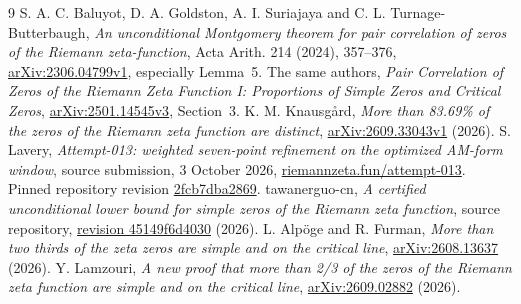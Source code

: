 \documentclass[11pt]{article}
\theoremstyle{remark}\newtheorem{remark}[theorem]{Remark}
\begin{document}
\begin{thebibliography}{9}
 S. A. C. Baluyot, D. A. Goldston, A. I. Suriajaya and
C. L. Turnage-Butterbaugh, \emph{An unconditional Montgomery theorem for pair
correlation of zeros of the Riemann zeta-function}, Acta Arith. 214 (2024),
357--376, \href{https://arxiv.org/abs/2306.04799v1}{arXiv:2306.04799v1},
especially Lemma~5.
 The same authors, \emph{Pair Correlation of Zeros of the
Riemann Zeta Function I: Proportions of Simple Zeros and Critical Zeros},
\href{https://arxiv.org/abs/2501.14545v3}{arXiv:2501.14545v3}, Section~3.
 K. M. Knausg\aa rd, \emph{More than 83.69\% of the zeros
of the Riemann zeta function are distinct},
\href{https://arxiv.org/abs/2609.33043v1}{arXiv:2609.33043v1} (2026).
 S. Lavery, \emph{Attempt-013: weighted seven-point refinement
on the optimized AM-form window}, source submission, 3 October 2026,
\href{https://www.riemannzeta.fun/submissions/attempt-013}{riemannzeta.fun/attempt-013}.
Pinned repository revision
\href{https://github.com/josusanmartin/riemann/tree/2fcb7dba28691632cdb0846d694c9b9902cfce66/submissions/attempt-013}{2fcb7dba2869}.
 tawanerguo-cn, \emph{A certified unconditional lower bound for
simple zeros of the Riemann zeta function}, source repository,
\href{https://github.com/tawanerguo-cn/zeta-simple-zeros/tree/45149f6d403059a71be73c5e3f884cee7cd62b20}{revision 45149f6d4030} (2026).
 L. Alp\"oge and R. Furman, \emph{More than two thirds of the zeta
zeros are simple and on the critical line},
\href{https://arxiv.org/abs/2608.13637}{arXiv:2608.13637} (2026).
 Y. Lamzouri, \emph{A new proof that more than 2/3 of the
zeros of the Riemann zeta function are simple and on the critical line},
\href{https://arxiv.org/abs/2609.02882}{arXiv:2609.02882} (2026).
\end{thebibliography}
\end{document}
